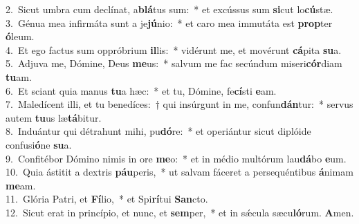 {2.~}Sicut umbra cum declínat, a\textbf{blá}tus sum:~* et excússus sum \textbf{si}cut lo\textbf{cú}stæ.\\
{3.~}Génua mea infirmáta sunt a je\textbf{jú}nio:~* et caro mea immutáta est \textbf{prop}ter \textbf{ó}leum.\\
{4.~}Et ego factus sum oppróbrium \textbf{il}lis:~* vidérunt me, et movérunt \textbf{cá}pita \textbf{su}a.\\
{5.~}Adjuva me, Dómine, Deus \textbf{me}us:~* salvum me fac secúndum miseri\textbf{cór}diam \textbf{tu}am.\\
{6.~}Et sciant quia manus \textbf{tu}a hæc:~* et tu, Dómine, fe\textbf{cí}sti \textbf{e}am.\\
{7.~}Maledícent illi, et tu benedíces:~† qui insúrgunt in me, confun\textbf{dán}tur:~* servus autem \textbf{tu}us læ\textbf{tá}bitur.\\
{8.~}Induántur qui détrahunt mihi, pu\textbf{dó}re:~* et operiántur sicut diplóide confusi\textbf{ó}ne \textbf{su}a.\\
{9.~}Confitébor Dómino nimis in ore \textbf{me}o:~* et in médio multórum lau\textbf{dá}bo \textbf{e}um.\\
{10.~}Quia ástitit a dextris \textbf{páu}peris,~* ut salvam fáceret a persequéntibus \textbf{á}nimam \textbf{me}am.\\
{11.~}Glória Patri, et \textbf{Fí}lio,~* et Spi\textbf{rí}tui \textbf{San}cto.\\
{12.~}Sicut erat in princípio, et nunc, et \textbf{sem}per,~* et in sǽcula sæcu\textbf{ló}rum. \textbf{A}men.\\
